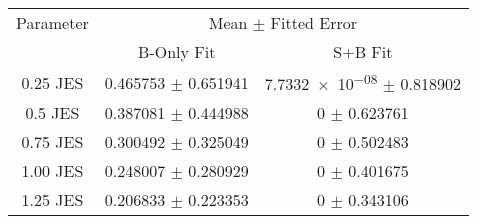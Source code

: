\begin{scriptsize}
\begin{table}
\centering
\begin{tabular}{ccc}
\toprule
Parameter & \multicolumn{2}{c}{{Mean $\pm$ Fitted Error}}\\
 & {B-Only Fit} & {S+B Fit}\\
\midrule
\num{0.25} JES & \num{0.465753} $\pm$ \num{0.651941} & \num{7.7332e-08} $\pm$ \num{0.818902}\\
\num{0.5} JES & \num{0.387081} $\pm$ \num{0.444988} & \num{0} $\pm$ \num{0.623761}\\
\num{0.75} JES & \num{0.300492} $\pm$ \num{0.325049} & \num{0} $\pm$ \num{0.502483}\\
\num{1.00} JES & \num{0.248007} $\pm$ \num{0.280929} & \num{0} $\pm$ \num{0.401675}\\
\num{1.25} JES & \num{0.206833} $\pm$ \num{0.223353} & \num{0} $\pm$ \num{0.343106}\\
\bottomrule
\end{tabular}
\end{table}
\end{scriptsize}
